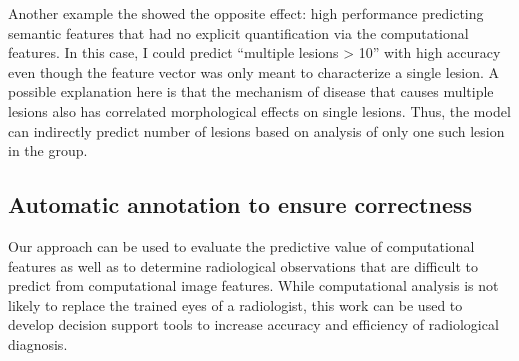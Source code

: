 Another example the showed the opposite effect: high performance predicting semantic features that had no explicit quantification via the computational features. In this case, I could predict ``multiple lesions > 10'' with high accuracy even though the feature vector was only meant to characterize a single lesion. A possible explanation here is that the mechanism of disease that causes multiple lesions also has correlated morphological effects on single lesions. Thus, the model can indirectly predict number of lesions based on analysis of only one such lesion in the group.

\subsection{Automatic annotation to ensure correctness}
Our approach can be used to evaluate the predictive value of computational features as well as to determine radiological observations that are difficult to predict from computational image features. While computational analysis is not likely to replace the trained eyes of a radiologist, this work can be used to develop decision support tools to increase accuracy and efficiency of radiological diagnosis.




